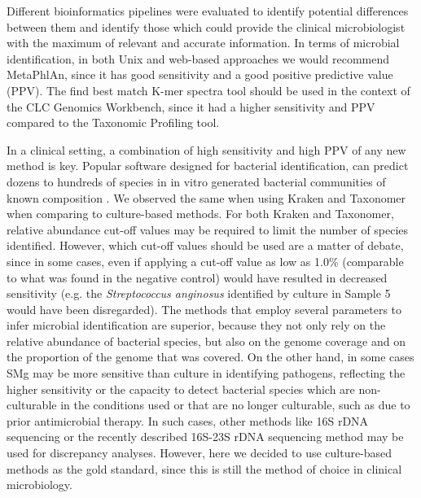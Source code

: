 Different bioinformatics pipelines were evaluated to identify potential differences between them and identify those which could provide the clinical microbiologist with the maximum of relevant and accurate information. In terms of microbial identification, in both Unix and web-based approaches we would recommend MetaPhlAn, since it has good sensitivity and a good positive predictive value (PPV). The find best match K-mer spectra tool should be used in the context of the CLC Genomics Workbench, since it had a higher sensitivity and PPV compared to the Taxonomic Profiling tool.

In a clinical setting, a combination of high sensitivity and high PPV of any new method is key. Popular software designed for bacterial identification, can predict dozens to hundreds of species in in vitro generated bacterial communities of known composition \citep{peabody_evaluation_2015}. We observed the same when using Kraken and Taxonomer when comparing to culture-based methods. For both Kraken and Taxonomer, relative abundance cut-off values may be required to limit the number of species identified. However, which cut-off values should be used are a matter of debate, since in some cases, even if applying a cut-off value as low as 1.0\% (comparable to what was found in the negative control) would have resulted in decreased sensitivity (e.g. the \textit{Streptococcus anginosus} identified by culture in Sample 5 would have been disregarded). The methods that employ several parameters to infer microbial identification are superior, because they not only rely on the relative abundance of bacterial species, but also on the genome coverage and on the proportion of the genome that was covered. On the other hand, in some cases SMg may be more sensitive than culture in identifying pathogens, reflecting the higher sensitivity or the capacity to detect bacterial species which are non-culturable in the conditions used or that are no longer culturable, such as due to prior antimicrobial therapy. In such cases, other methods like 16S rDNA sequencing or the recently described 16S-23S rDNA sequencing method \citep{sabat_targeted_2017} may be used for discrepancy analyses. However, here we decided to use culture-based methods as the gold standard, since this is still the method of choice in clinical microbiology.

